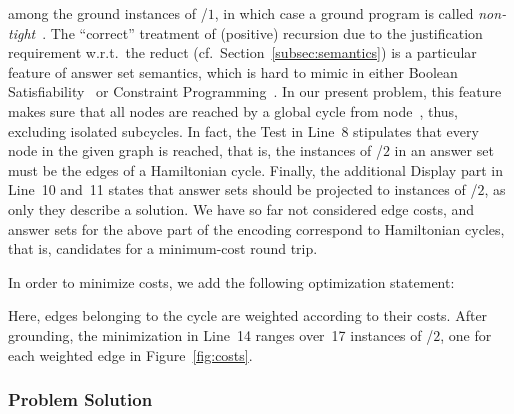 among the ground instances of /$1$,
in which case a ground program is called \emph{non-tight}~\cite{erdlif03a,fages94a}.
The ``correct'' treatment of (positive) recursion due to the justification
requirement w.r.t.\ the reduct (cf.\ Section~\ref{subsec:semantics})
is a particular feature of answer set semantics,
which is hard to mimic in either
Boolean Satisfiability~\cite{bihemawa08a} or
Constraint Programming~\cite{robewa06a}.
In our present problem, this feature makes sure that all nodes are reached
by a global cycle from node~, thus, excluding isolated subcycles.
In fact, the Test in Line~8 stipulates that every node in the given graph
is reached, that is, the instances of /$2$ in an answer set
must be the edges of a Hamiltonian cycle.%
Finally, the additional Display part in Line~10 and~11 states that answer
sets should be projected to instances of /$2$, as only they
describe a solution.
We have so far not considered edge costs,
and answer sets for the above 
part of the encoding correspond to Hamiltonian cycles,
that is, candidates for a minimum-cost round trip.

In order to minimize costs,
we add the following optimization statement:
%

%
Here, edges belonging to the cycle are weighted according to their costs.
After grounding, the minimization in Line~14 ranges over~17 instances
of /$2$, one for each weighted edge in Figure~\ref{fig:costs}.

\subsubsection{Problem Solution}\label{subsec:tsp:solution}


